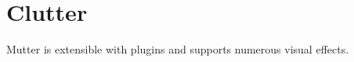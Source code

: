 \chapter{Clutter}
\label{chap:Clutter}

Mutter is extensible with plugins and supports numerous visual effects. 